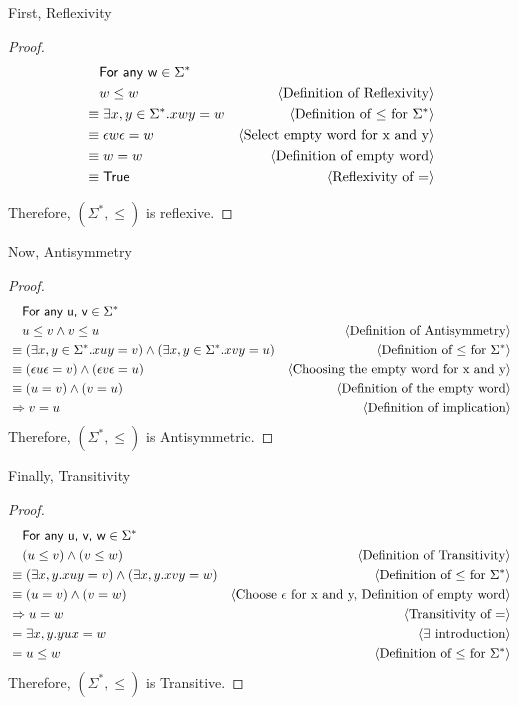 \documentclass[11pt,fleqn]{article}
\newcommand{\mname}[1]{\mbox{\sf #1}}
\newcommand{\pnote}[1]{{\langle \text{#1} \rangle}}
\begin{document}
  First, Reflexivity
  \begin{proof}
    \begin{align*}
      &\phantom{{}=} \mname{For any w} \in \Sigma^* \\
      &\phantom{{}=} w \leq w &\pnote{Definition of Reflexivity}\\
      &\equiv \exists x,y \in \Sigma^* . xwy = w &\pnote{Definition of $\leq$ for $\Sigma^*$}\\
      &\equiv \epsilon w \epsilon = w & \pnote{Select empty word for x and y}\\
      &\equiv w = w & \pnote {Definition of empty word}\\
      &\equiv \mname{True} & \pnote{Reflexivity of $=$}
    \end{align*}

    Therefore, $(\Sigma^*,\leq)$ is reflexive.
  \end{proof}

  Now, Antisymmetry
  \begin{proof}
    \begin{align*}
      &\phantom{{}=} \mname{For any u, v} \in \Sigma^*\\
      &\phantom{{}=} u \leq v \land v \leq u & \pnote{Definition of Antisymmetry}\\
      &\equiv (\exists x,y \in \Sigma^* . xuy = v) \land (\exists x,y \in \Sigma^* . xvy = u) & \pnote{Definition of $\leq$ for $\Sigma^*$}\\
      &\equiv (\epsilon u \epsilon = v) \land (\epsilon v \epsilon = u) & \pnote{Choosing the empty word for x and y}\\
      &\equiv (u = v) \land (v = u) & \pnote{Definition of the empty word}\\
      &\Rightarrow v = u &\pnote{Definition of implication}
    \end{align*}
    Therefore, $(\Sigma^*, \leq)$ is Antisymmetric.
  \end{proof}

  \newpage
  Finally, Transitivity
  \begin{proof}
    \begin{align*}
      &\phantom{{}=} \mname{For any u, v, w} \in \Sigma^*\\
      &\phantom{{}=} (u \leq v) \land (v \leq w) &\pnote{Definition of Transitivity}\\
      &\equiv (\exists x,y . xuy = v) \land (\exists x,y . xvy = w) &\pnote{Definition of $\leq$ for $\Sigma^*$}\\
      &\equiv (u = v) \land (v = w) &\pnote{Choose $\epsilon$ for x and y, Definition of empty word}\\
      &\Rightarrow u = w &\pnote{Transitivity of $=$}\\
      &= \exists x,y . yux = w &\pnote{$\exists$ introduction}\\
      &= u \leq w &\pnote{Definition of $\leq$ for $\Sigma^*$}
    \end{align*}
    Therefore, $(\Sigma^*, \leq)$ is Transitive.
  \end{proof}
\end{document}
